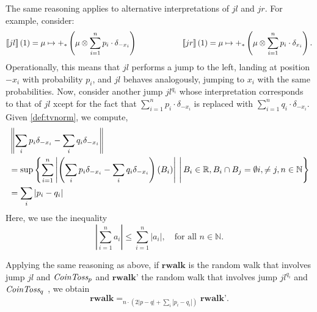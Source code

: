 \begin{example}
  
The same reasoning applies to alternative interpretations of $jl$ and $jr$. For example, consider:
\[
                        \left \llbracket jl \right \rrbracket(1)= \mu \mapsto +_\ast \left(\mu \otimes \sum_{i=1}^n  p_i\cdot  \delta_{-x_i}\right)
                        \hspace{2cm}
                        \left \llbracket jr \right \rrbracket(1) =\mu \mapsto +_\ast \left(\mu \otimes \sum_{i=1}^n p_i\cdot \delta_{x_i}\right).
        \]
Operationally, this means that $jl$ performs a jump to the left, landing at position $-x_i$ with probability $p_i$, and $jl$ behaves analogously, jumping to $x_i$ with the same probabilities. Now, consider another jump $jl^{q_i}$ whose interpretation corresponds to that of $jl$ xcept for the fact that $\sum_{i=1}^n p_i\cdot \delta_{-x_i}$ is replaced with $ \sum_{i=1}^n  q_i\cdot \delta_{-x_i}$.
Given \autoref{def:tvnorm}, we compute,
    \begin{align*}
      &\left\lVert  \sum_i p_i \delta_{-x_i} - \sum_i q_i \delta_{-x_i} \right\rVert  \\
      & = \sup \left\{ \sum_{i=1}^{n} \left\lvert \left(\sum_i p_i \delta_{-x_i} - \sum_i q_i \delta_{-x_i} \right) (B_i) \right\rvert \,\Bigg| \, B_i \in \mathbb{R}, B_i \cap B_j = \emptyset i,  \neq j, n \in \mathbb{N}  \right\} \\
      & = \sum_i |p_i-q_i|
    \end{align*}
    Here, we use the inequality
\[
\left| \sum_{i=1}^{n} a_i \right| \leq \sum_{i=1}^{n} |a_i|, \quad \text{for all } n \in \mathbb{N}.
\]

Applying the same reasoning as above, if $\textbf{rwalk}$ is the random walk that involves jump $jl$ and $ \emph{CoinToss}_p$  and $\textbf{rwalk'}$ the random walk that involves jump $jl^{q_i}$ and $ \emph{CoinToss}_q$ , we obtain 
 \[
                \textbf{rwalk} =_{n \cdot \left(2 |p-q|+ \sum_i |p_i-q_i|\right)}
                \textbf{rwalk'}. 
        \]


        
\end{example}